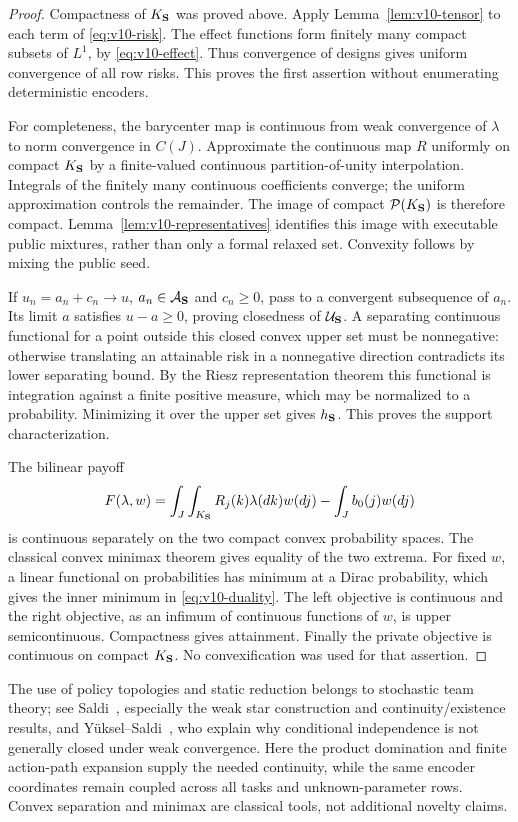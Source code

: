 \begin{proof}
Compactness of $K_{\bf S}$ was proved above. Apply
Lemma~\ref{lem:v10-tensor} to each term of \eqref{eq:v10-risk}.
The effect functions form finitely many compact subsets of $L^1$,
by \eqref{eq:v10-effect}. Thus convergence of designs gives uniform
convergence of all row risks. This proves the first assertion without
enumerating deterministic encoders.

For completeness, the barycenter map is continuous from weak convergence
of $\lambda$ to norm convergence in $C(J)$. Approximate the continuous
map $R$ uniformly on compact $K_{\bf S}$ by a finite-valued continuous
partition-of-unity interpolation. Integrals of the finitely many
continuous coefficients converge; the uniform approximation controls
the remainder. The image of compact $\mathcal P(K_{\bf S})$ is therefore
compact. Lemma~\ref{lem:v10-representatives} identifies this image with
executable public mixtures, rather than only a formal relaxed set.
Convexity follows by mixing the public seed.

If $u_n=a_n+c_n\to u$, $a_n\in\mathcal A_{\bf S}$ and $c_n\ge0$,
pass to a convergent subsequence of $a_n$. Its limit $a$ satisfies
$u-a\ge0$, proving closedness of $\mathcal U_{\bf S}$. A separating
continuous functional for a point outside this closed convex upper
set must be nonnegative: otherwise translating an attainable risk
in a nonnegative direction contradicts its lower separating bound.
By the Riesz representation theorem this functional is integration
against a finite positive measure, which may be normalized to a
probability. Minimizing it over the upper set gives $h_{\bf S}$.
This proves the support characterization.

The bilinear payoff
\[
 F(\lambda,w)=\int_J\int_{K_{\bf S}}R_j(k)\lambda(dk)w(dj)
             -\int_J b_0(j)w(dj)
\]
is continuous separately on the two compact convex probability spaces.
The classical convex minimax theorem gives equality of the two extrema.
For fixed $w$, a linear functional on probabilities has minimum at a
Dirac probability, which gives the inner minimum in
\eqref{eq:v10-duality}. The left objective is continuous and the right
objective, as an infimum of continuous functions of $w$, is upper
semicontinuous. Compactness gives attainment. Finally the private
objective is continuous on compact $K_{\bf S}$. No convexification
was used for that assertion.
\end{proof}

The use of policy topologies and static reduction belongs to stochastic
team theory; see Saldi~\cite{Saldi2017Topology}, especially the weak star
construction and continuity/existence results, and
Y\"uksel--Saldi~\cite{YukselSaldi2017}, who explain why conditional
independence is not generally closed under weak convergence. Here the
product domination and finite action-path expansion supply the needed
continuity, while the same encoder coordinates remain coupled across
all tasks and unknown-parameter rows. Convex separation and minimax
are classical tools, not additional novelty claims.

